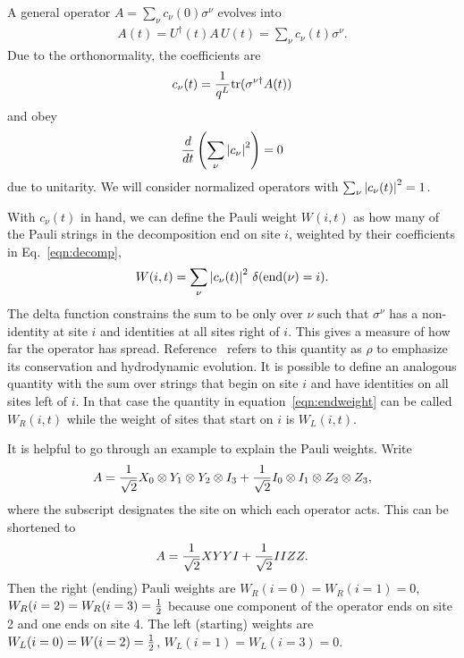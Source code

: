 A general operator $A = \sum_\nu c_{\nu}(0)\sigma^\nu$ evolves into
\begin{align}
A(t) = U^\dag(t)A\,U(t) = \sum_\nu c_\nu(t)\sigma^\nu.\label{eqn:decomp}
\end{align}
Due to the orthonormality, the coefficients are 
\begin{align}
c_\nu(t) = \frac{1}{q^L}\text{tr}(\sigma^{\nu\dag}A(t))
\end{align}
and obey 
\begin{align}
\frac{d}{dt} \left(\sum_\nu \left|c_\nu\right|^2\right) = 0 \nonumber
\end{align}
due to unitarity. We will consider normalized operators with $\sum_\nu\left|c_\nu(t)\right|^2=1$.

With $c_\nu(t)$ in hand, we can define the Pauli weight $W(i,t)$ as how many of the Pauli strings in the decomposition end on site $i$, weighted by their coefficients in Eq.~\ref{eqn:decomp},
\begin{align}
W(i,t) = \sum_\nu\left|c_\nu(t)\right|^2\,\delta(\text{end}(\nu)=i).
	\label{eqn:endweight}
\end{align}
The delta function constrains the sum to be only over $\nu$ such that $\sigma^\nu$ has a non-identity at site $i$ and identities at all sites right of $i$. This gives a measure of how far the operator has spread. Reference~\cite{Keyserlingk} refers to this quantity as $\rho$ to emphasize its conservation and hydrodynamic evolution. It is possible to define an analogous quantity with the sum over strings that begin on site $i$ and have identities on all sites left of $i$. In that case the quantity in equation~\ref{eqn:endweight} can be called $W_R(i,t)$ while the weight of sites that start on $i$ is $W_L(i,t)$.

It is helpful to go through an example to explain the Pauli weights. Write
\begin{align}
A = \frac{1}{\sqrt{2}} X_0\otimes Y_1\otimes Y_2\otimes I_3 + \frac{1}{\sqrt{2}} I_0\otimes I_1\otimes Z_2\otimes Z_3,
	\nonumber
\end{align}
where the subscript designates the site on which each operator acts. This can be shortened to
\begin{align}
A = \frac{1}{\sqrt{2}} XYYI + \frac{1}{\sqrt{2}} IIZZ\label{eqn:inioper}.
\end{align}
Then the right (ending) Pauli weights are $W_R(i=0) = W_R(i=1) = 0$, $W_R(i=2)= W_R(i=3) =\frac{1}{2}$ because one component of the operator ends on site 2 and one ends on site 4. The left (starting) weights are $W_L(i=0) = W(i=2) =\frac{1}{2}$, $W_L(i=1) = W_L(i=3)=0$.

